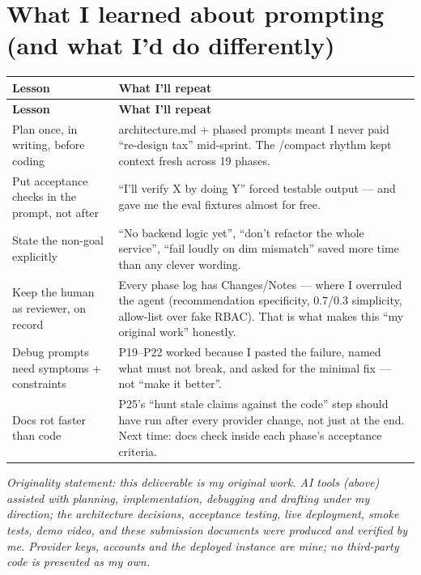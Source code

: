 \documentclass[11pt,a4paper]{article}
\begin{document}
\section{What I learned about prompting (and what I'd do differently)}

\begin{longtable}{p{4.5cm}p{10.5cm}}
\toprule
\textbf{Lesson} & \textbf{What I'll repeat} \\
\midrule
\endfirsthead
\toprule
\textbf{Lesson} & \textbf{What I'll repeat} \\
\midrule
\endhead
Plan once, in writing, before coding &
architecture.md + phased prompts meant I never paid ``re-design tax'' mid-sprint. The /compact rhythm kept context fresh across 19 phases. \\
\midrule
Put acceptance checks in the prompt, not after &
``I'll verify X by doing Y'' forced testable output --- and gave me the eval fixtures almost for free. \\
State the non-goal explicitly &
``No backend logic yet'', ``don't refactor the whole service'', ``fail loudly on dim mismatch'' saved more time than any clever wording. \\
Keep the human as reviewer, on record &
Every phase log has Changes/Notes --- where I overruled the agent (recommendation specificity, 0.7/0.3 simplicity, allow-list over fake RBAC). That is what makes this ``my original work'' honestly. \\
Debug prompts need symptoms + constraints &
P19--P22 worked because I pasted the failure, named what must not break, and asked for the minimal fix --- not ``make it better''. \\
Docs rot faster than code &
P25's ``hunt stale claims against the code'' step should have run after every provider change, not just at the end. Next time: docs check inside each phase's acceptance criteria. \\
\bottomrule
\end{longtable}

\begin{shaded}
\noindent\textit{Originality statement: this deliverable is my original work. AI tools (above) assisted
with planning, implementation, debugging and drafting under my direction; the architecture decisions,
acceptance testing, live deployment, smoke tests, demo video, and these submission documents were
produced and verified by me. Provider keys, accounts and the deployed instance are mine; no
third-party code is presented as my own.}
\end{shaded}
\end{document}
